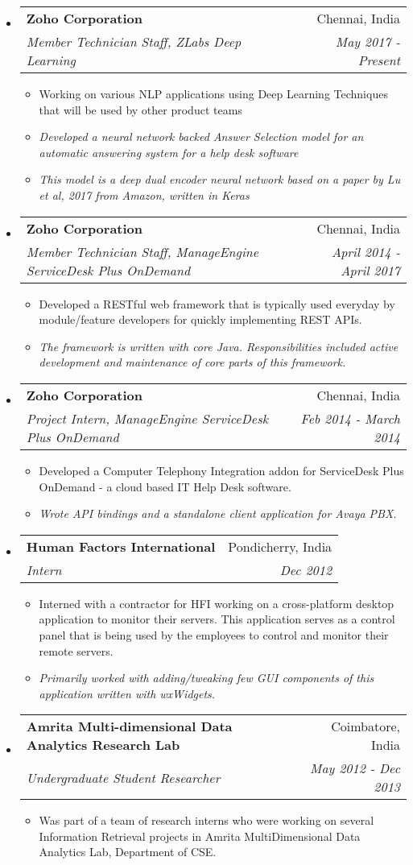 \documentclass[letterpaper,11pt]{article}
\makeatletter
\newcommand{\resitem}[1]{\item #1 \vspace{-2pt}}
\newcommand{\resheading}[1]{\textbf{\sffamily{\mbox{~}{\large #1} \vphantom{p\^{E}}}}}
\newcommand{\ressubheading}[4]{
\begin{tabular*}{6.5in}{l@{\extracolsep{\fill}}r}
		\textbf{#1} & #2 \\
		\textit{#3} & \textit{#4} \\
\end{tabular*}\vspace{-6pt}}
\makeatother
\begin{document}
\vspace{0.05in}
\resheading{Work Experience}
\begin{itemize}
\item[]
	\ressubheading{Zoho Corporation}{Chennai, India}{Member Technician Staff, ZLabs Deep Learning}{May 2017 - Present}
	\begin{itemize}
		\resitem{Working on various NLP applications using Deep Learning Techniques that will be used by other product teams}
		\resitem{\textit{Developed a neural network backed Answer Selection model for an automatic answering system for a help desk software}}
		\resitem{\textit{This model is a deep dual encoder neural network based on a paper by Lu et al, 2017 from Amazon, written in Keras}}
	\end{itemize}
	
\item[]
	\ressubheading{Zoho Corporation}{Chennai, India}{Member Technician Staff, ManageEngine ServiceDesk Plus OnDemand}{April 2014 - April 2017}
	\begin{itemize}
		\resitem{Developed a RESTful web framework that is typically used everyday by module/feature developers for quickly implementing REST APIs.}
		\resitem{\textit{The framework is written with core Java. Responsibilities included active development and maintenance of core parts of this framework.}}
	\end{itemize}

\item[]
	\ressubheading{Zoho Corporation}{Chennai, India}{Project Intern, ManageEngine ServiceDesk Plus OnDemand}{Feb 2014 - March 2014}
	\begin{itemize}
		\resitem{Developed a Computer Telephony Integration addon for ServiceDesk Plus OnDemand - a cloud based IT Help Desk software.}
		\resitem{\textit{Wrote API bindings and a standalone client application for Avaya PBX.}}
	\end{itemize}
\vspace{3em}
\item[]
	\ressubheading{Human Factors International}{Pondicherry, India}{Intern}{Dec 2012}
	\begin{itemize}
		\resitem{Interned with a contractor for HFI working on a cross-platform desktop application to monitor their servers. This application serves as a control panel that is being used by the employees to control and monitor their remote servers.}
        \resitem{\textit{Primarily worked with adding/tweaking few GUI components of this application written with wxWidgets.}}
	\end{itemize}

\item[]
	\ressubheading{Amrita Multi-dimensional Data Analytics Research Lab}{Coimbatore, India}{Undergraduate Student Researcher}{May 2012 - Dec 2013}
	\begin{itemize}
		\resitem{Was part of a team of research interns who were working on several Information Retrieval projects in Amrita MultiDimensional Data Analytics Lab, Department of CSE.}
	\end{itemize}

\end{itemize}
\end{document}
